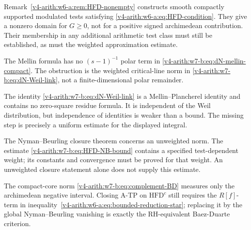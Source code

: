 \begin{remark}
\label{v4-arith:w7-b:rem:obstruction-3}
Remark~\ref{v4-arith:w6-a:rem:HFD-nonempty} constructs smooth
compactly supported modulated tests satisfying
\eqref{v4-arith:w6-a:eq:HFD-condition}. They give a nonzero domain
for \(G\ge0\), not for a positive signed archimedean contribution.
Their membership in any additional arithmetic test class must still
be established, as must the weighted approximation estimate.
\end{remark}

\begin{remark}
\label{v4-arith:w7-b:rem:obstruction-4}
The Mellin formula has no \((s-1)^{-1}\) polar
term in \eqref{v4-arith:w7-b:eq:dN-mellin-compact}. The obstruction is
the weighted critical-line norm in
\eqref{v4-arith:w7-b:eq:dN-Weil-link}, not a finite-dimensional polar
remainder.
\end{remark}

\begin{remark}
\label{v4-arith:w7-b:rem:obstruction-5}
The identity \eqref{v4-arith:w7-b:eq:dN-Weil-link} is a
Mellin--Plancherel identity and contains no zero-square residue
formula. It is independent of the Weil distribution, but independence
of identities is weaker than a bound. The missing step is precisely a
uniform estimate for the displayed integral.
\end{remark}

\begin{remark}
\label{v4-arith:w7-b:rem:obstruction-6}
The Nyman--Beurling closure theorem concerns an unweighted norm.
The estimate \eqref{v4-arith:w7-b:eq:HFD-NB-bound} contains a
specified test-dependent weight; its constants and convergence must
be proved for that weight. An unweighted closure statement alone
does not supply this estimate.
\end{remark}

\begin{remark}
\label{v4-arith:w7-b:rem:obstruction-7}
The compact-core norm \eqref{v4-arith:w7-b:eq:complement-BD} measures
only the archimedean negative interval. Closing A-TP on
\(\mathrm{HFD}^{c}\) still requires the \(R[f]\)-term in
inequality~\eqref{v4-arith:w6-a:eq:bounded-reduction-star}; replacing it by the
global Nyman--Beurling vanishing is exactly the RH-equivalent
Baez-Duarte criterion.
\end{remark}

